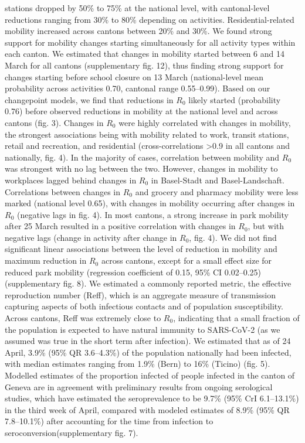 stations dropped by 50\% to 75\% at the national level, with cantonal-level reductions ranging from 30\% to 80\% depending on activities. Residential-related mobility increased across cantons between 20\% and 30\%. We found strong support for mobility changes starting simultaneously for all activity types within each canton. We estimated that changes in mobility started between 6 and 14 March for all cantons (supplementary fig. 12), thus finding strong support for changes starting before school closure on 13 March (national-level mean probability across activities 0.70, cantonal range 0.55–0.99). Based on our changepoint models, we find that reductions in $R_0$ likely started (probability 0.76) before observed reductions in mobility at the national level and across cantons (fig. 3). Changes in $R_0$ were highly correlated with changes in mobility, the strongest associations being with mobility related to work, transit stations, retail and recreation, and residential (cross-correlations >0.9 in all cantons and nationally, fig. 4). In the majority of cases, correlation between mobility and $R_0$ was strongest with no lag between the two. However, changes in mobility to workplaces lagged behind changes in $R_0$ in Basel-Stadt and Basel-Landschaft. Correlations between changes in $R_0$ and grocery and pharmacy mobility were less marked (national level 0.65), with changes in mobility occurring after changes in $R_0$ (negative lags in fig. 4). In most cantons, a strong increase in park mobility after 25 March resulted in a positive correlation with changes in $R_0$, but with negative lags (change in activity after change in $R_0$, fig. 4). We did not find significant linear associations between the level of reduction in mobility and maximum reduction in $R_0$ across cantons, except for a small effect size for reduced park mobility (regression coefficient of 0.15, 95\% CI 0.02–0.25) (supplementary fig. 8). We estimated a commonly reported metric, the effective reproduction number (Reff), which is an aggregate measure of transmission capturing aspects of both infectious contacts and of population susceptibility. Across cantons, Reff was extremely close to $R_0$, indicating that a small fraction of the population is expected to have natural immunity to SARS-CoV-2 (as we assumed was true in the short term after infection). We estimated that as of 24 April, 3.9\% (95\% QR 3.6–4.3\%) of the population nationally had been infected, with median estimates ranging from 1.9\% (Bern) to 16\% (Ticino) (fig. 5). Modelled estimates of the proportion infected of people infected in the canton of Geneva are in agreement with preliminary results from ongoing serological studies, which have estimated the seroprevalence to be 9.7\% (95\% CrI 6.1–13.1\%) in the third week of April\cite{Stringhini:RepeatedSeroprevalenceAntiSARSCoV2:2020}, compared with modeled estimates of 8.9\% (95\% QR 7.8–10.1\%) after accounting for the time from infection to seroconversion\cite{Wolfel:VirologicalAssessmentHospitalized:2020}(supplementary fig. 7).

